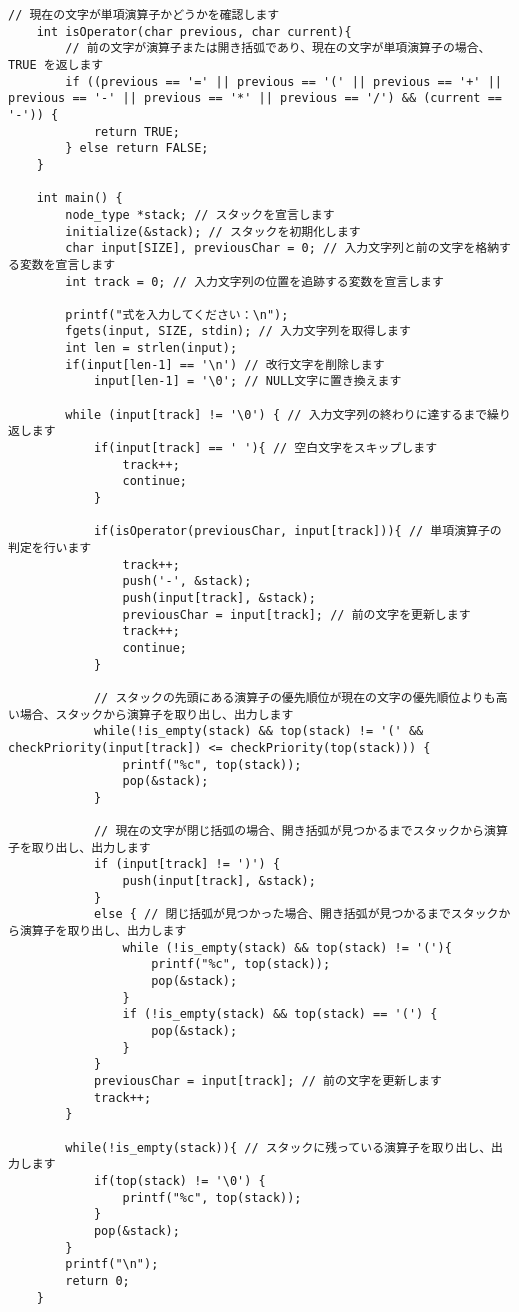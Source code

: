 \documentclass[]{jsarticle}
\begin{document}
\begin{lstlisting}[caption={reversePolishNotation.c}]
    // 現在の文字が単項演算子かどうかを確認します
    int isOperator(char previous, char current){
        // 前の文字が演算子または開き括弧であり、現在の文字が単項演算子の場合、TRUE を返します
        if ((previous == '=' || previous == '(' || previous == '+' || previous == '-' || previous == '*' || previous == '/') && (current == '-')) {
            return TRUE;
        } else return FALSE;
    }
    
    int main() {
        node_type *stack; // スタックを宣言します
        initialize(&stack); // スタックを初期化します
        char input[SIZE], previousChar = 0; // 入力文字列と前の文字を格納する変数を宣言します
        int track = 0; // 入力文字列の位置を追跡する変数を宣言します
    
        printf("式を入力してください：\n");
        fgets(input, SIZE, stdin); // 入力文字列を取得します
        int len = strlen(input); 
        if(input[len-1] == '\n') // 改行文字を削除します
            input[len-1] = '\0'; // NULL文字に置き換えます
    
        while (input[track] != '\0') { // 入力文字列の終わりに達するまで繰り返します
            if(input[track] == ' '){ // 空白文字をスキップします
                track++;
                continue;
            }
    
            if(isOperator(previousChar, input[track])){ // 単項演算子の判定を行います
                track++;
                push('-', &stack);
                push(input[track], &stack);
                previousChar = input[track]; // 前の文字を更新します
                track++;
                continue;
            }
    
            // スタックの先頭にある演算子の優先順位が現在の文字の優先順位よりも高い場合、スタックから演算子を取り出し、出力します
            while(!is_empty(stack) && top(stack) != '(' && checkPriority(input[track]) <= checkPriority(top(stack))) {
                printf("%c", top(stack));
                pop(&stack);
            }
    
            // 現在の文字が閉じ括弧の場合、開き括弧が見つかるまでスタックから演算子を取り出し、出力します
            if (input[track] != ')') {
                push(input[track], &stack);
            } 
            else { // 閉じ括弧が見つかった場合、開き括弧が見つかるまでスタックから演算子を取り出し、出力します
                while (!is_empty(stack) && top(stack) != '('){
                    printf("%c", top(stack));
                    pop(&stack);
                }
                if (!is_empty(stack) && top(stack) == '(') {
                    pop(&stack);
                }
            }
            previousChar = input[track]; // 前の文字を更新します
            track++;
        }
    
        while(!is_empty(stack)){ // スタックに残っている演算子を取り出し、出力します
            if(top(stack) != '\0') {
                printf("%c", top(stack));
            }
            pop(&stack);
        }
        printf("\n");
        return 0;
    }
\end{lstlisting}
\end{document}
